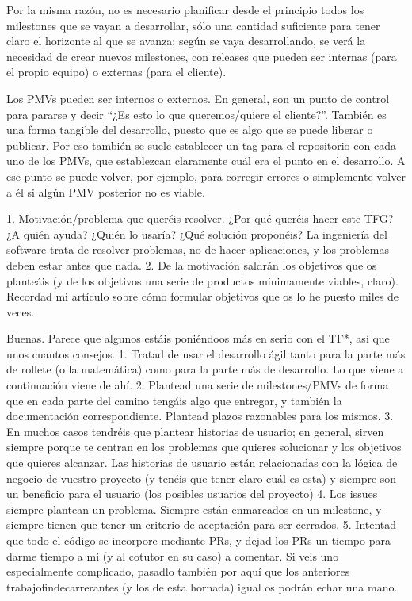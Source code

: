 Por la misma razón, no es necesario planificar desde el principio todos los milestones que se vayan a desarrollar, sólo una cantidad suficiente para tener claro el horizonte al que se avanza; según se vaya desarrollando, se verá la necesidad de crear nuevos milestones, con releases que pueden ser internas (para el propio equipo) o externas (para el cliente).

Los PMVs pueden ser internos o externos. En general, son un punto de control para pararse y decir “¿Es esto lo que queremos/quiere el cliente?”. También es una forma tangible del desarrollo, puesto que es algo que se puede liberar o publicar. Por eso también se suele establecer un tag para el repositorio con cada uno de los PMVs, que establezcan claramente cuál era el punto en el desarrollo. A ese punto se puede volver, por ejemplo, para corregir errores o simplemente volver a él si algún PMV posterior no es viable.

1. Motivación/problema que queréis resolver. ¿Por qué queréis hacer este TFG? ¿A quién ayuda? ¿Quién lo usaría? ¿Qué solución proponéis? La ingeniería del software trata de resolver problemas, no de hacer aplicaciones, y los problemas deben estar antes que nada.
2. De la motivación saldrán los objetivos que os planteáis (y de los objetivos una serie de productos mínimamente viables, claro). Recordad mi artículo sobre cómo formular objetivos que os lo he puesto miles de veces.

Buenas. Parece que algunos estáis poniéndoos más en serio con el TF*, así que unos cuantos consejos.
1. Tratad de usar el desarrollo ágil tanto para la parte más de rollete (o la matemática) como para la parte más de desarrollo. Lo que viene a continuación viene de ahí.
2. Plantead una serie de milestones/PMVs de forma que en cada parte del camino tengáis algo que entregar, y también la documentación correspondiente. Plantead plazos razonables para los mismos.
3. En muchos casos tendréis que plantear historias de usuario; en general, sirven siempre porque te centran en los problemas que quieres solucionar y los objetivos que quieres alcanzar. Las historias de usuario están relacionadas con la lógica de negocio de vuestro proyecto (y tenéis que tener claro cuál es esta) y siempre son un beneficio para el usuario (los posibles usuarios del proyecto)
4. Los issues siempre plantean un problema. Siempre están enmarcados en un milestone, y siempre tienen que tener un criterio de aceptación para ser cerrados. 
5. Intentad que todo el código se incorpore mediante PRs, y dejad los PRs un tiempo para darme tiempo a mi (y al cotutor en su caso) a comentar. Si veis uno especialmente complicado, pasadlo también por aquí que los anteriores trabajofindecarrerantes (y los de esta hornada) igual os podrán echar una mano.

